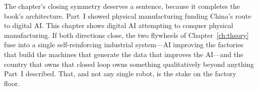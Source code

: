 The chapter's closing symmetry deserves a sentence, because it completes the book's architecture. Part~I showed physical manufacturing funding China's route to digital AI. This chapter shows digital AI attempting to conquer physical manufacturing. If both directions close, the two flywheels of Chapter~\ref{ch:theory} fuse into a single self-reinforcing industrial system---AI improving the factories that build the machines that generate the data that improves the AI---and the country that owns that closed loop owns something qualitatively beyond anything Part~I described. That, and not any single robot, is the stake on the factory floor.
